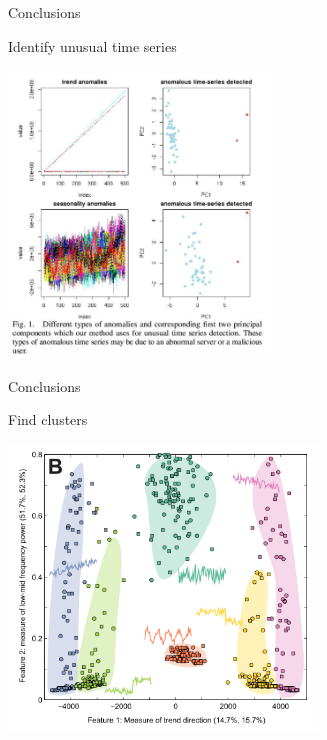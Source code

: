 \documentclass[12pt,ignorenonframetext,compress]{beamer}
\begin{document}
\begin{frame}{Conclusions}

\begin{block}{Identify unusual time series}

\centerline{\includegraphics[height=3in]{figures/unusual.png}}

\end{block}

\end{frame}

\begin{frame}{Conclusions}

\begin{block}{Find clusters}

\centerline{\includegraphics[height=3in]{figures/clustering2.png}}

\end{block}

\end{frame}
\end{document}
